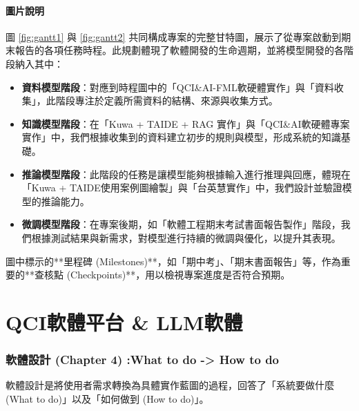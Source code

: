 \documentclass[twocolumn,11pt,a4paper]{article}
\begin{document}
\subsection{圖片說明}
圖 \ref{fig:gantt1} 與 \ref{fig:gantt2} 共同構成專案的完整甘特圖，展示了從專案啟動到期末報告的各項任務時程。此規劃體現了軟體開發的生命週期，並將模型開發的各階段納入其中：
\begin{itemize}
    \item \textbf{資料模型階段}：對應到時程圖中的「QCI\&AI-FML軟硬體實作」與「資料收集」，此階段專注於定義所需資料的結構、來源與收集方式。
    \item \textbf{知識模型階段}：在「Kuwa + TAIDE + RAG 實作」與「QCI\&AI軟硬體專案實作」中，我們根據收集到的資料建立初步的規則與模型，形成系統的知識基礎。
    \item \textbf{推論模型階段}：此階段的任務是讓模型能夠根據輸入進行推理與回應，體現在「Kuwa + TAIDE使用案例圖繪製」與「台英慧實作」中，我們設計並驗證模型的推論能力。
    \item \textbf{微調模型階段}：在專案後期，如「軟體工程期末考試書面報告製作」階段，我們根據測試結果與新需求，對模型進行持續的微調與優化，以提升其表現。
\end{itemize}
圖中標示的**里程碑 (Milestones)**，如「期中考」、「期末書面報告」等，作為重要的**查核點 (Checkpoints)**，用以檢視專案進度是否符合預期。

\part{QCI軟體平台 \& LLM軟體}

\section{軟體設計 (Chapter 4) :What to do -> How to do}
軟體設計是將使用者需求轉換為具體實作藍圖的過程，回答了「系統要做什麼 (What to do)」以及「如何做到 (How to do)」\cite{lee2024se}。
\end{document}
